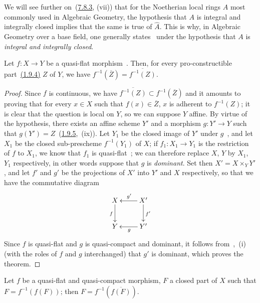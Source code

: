 \begin{remark}[2.3.9]
\label{IV.2.3.9}
We will see further on~({\hyperref[IV.7.8.3]{7.8.3}}, (vii)) that for the Noetherian local rings $A$ most commonly used in Algebraic Geometry, the hypothesis that $A$ is integral and integrally closed implies that the same is true of $\widehat{A}$.
This is why, in Algebraic Geometry over a base field, one generally states~ under the hypothesis that $A$ is \emph{integral and integrally closed}.
\end{remark}

\begin{theorem}[2.3.10]
\label{IV.2.3.10}
Let $f:X\to Y$ be a quasi-flat morphism~.
Then, for every pro-constructible part~{\hyperref[IV.1.9.4]{(1.9.4)}} $Z$ of $Y$, we have $f^{-1}(\overline Z)=\overline{f^{-1}(Z)}$.
\end{theorem}

\begin{proof}
Since $f$ is continuous, we have $\overline{f^{-1}(Z)}\subset f^{-1}(\overline{Z})$ and it amounts to proving that for every $x\in X$ such that $f(x)\in\overline{Z}$, $x$ is adherent to $f^{-1}(Z)$;
it is clear that the question is local on $Y$, so we can suppose $Y$ affine.
By virtue of the hypothesis, there exists an affine scheme $Y'$ and a morphism $g:Y'\to Y$ such that $g(Y')=Z$~({\hyperref[IV.1.9.5]{1.9.5}},~(ix)).
Let $Y_1$ be the closed image of $Y'$ under $g$~, and let $X_1$ be the closed sub-prescheme $f^{-1}(Y_1)$ of $X$; if $f_1:X_1\to Y_1$ is the restriction of $f$ to $X_1$, we know that $f_1$ is quasi-flat~; we can therefore replace $X$, $Y$ by $X_1$, $Y_1$ respectively, in other words suppose that $g$ is \emph{dominant}.
Set then $X'=X\times_Y Y'$, and let $f'$ and $g'$ be the projections of $X'$ into $Y'$ and $X$ respectively, so that we have the commutative diagram
\[
\xymatrix{
  X \ar[d]_f & X' \ar[l]_{g'} \ar[d]^{f'} \\
  Y & Y' \ar[l]^g
}
\]
Since $f$ is quasi-flat and $g$ is quasi-compact and dominant, it follows from~,~(i) (with the roles of $f$ and $g$ interchanged) that $g'$ is dominant, which proves the theorem.
\end{proof}

\begin{corollary}[2.3.11]
\label{IV.2.3.11}
Let $f$ be a quasi-flat and quasi-compact morphism, $F$ a closed part of $X$ such that $F=f^{-1}(f(F))$; then $F=f^{-1}(\overline{f(F)})$.
\end{corollary}

